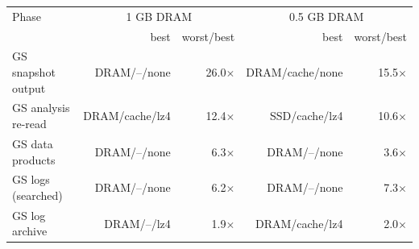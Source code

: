 \begin{tabular}{lrrrr}
\toprule
Phase & \multicolumn{2}{c}{1 GB DRAM} & \multicolumn{2}{c}{0.5 GB DRAM} \\
 & best & worst/best & best & worst/best \\
\midrule
GS snapshot output & DRAM/--/none & 26.0$\times$ & DRAM/cache/none & 15.5$\times$ \\
GS analysis re-read & DRAM/cache/lz4 & 12.4$\times$ & SSD/cache/lz4 & 10.6$\times$ \\
GS data products & DRAM/--/none & 6.3$\times$ & DRAM/--/none & 3.6$\times$ \\
GS logs (searched) & DRAM/--/none & 6.2$\times$ & DRAM/--/none & 7.3$\times$ \\
GS log archive & DRAM/--/lz4 & 1.9$\times$ & DRAM/cache/lz4 & 2.0$\times$ \\
\bottomrule
\end{tabular}
